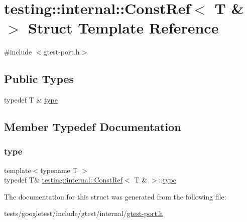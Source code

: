 \hypertarget{structtesting_1_1internal_1_1ConstRef_3_01T_01_6_01_4}{}\section{testing\+:\+:internal\+:\+:Const\+Ref$<$ T \& $>$ Struct Template Reference}
\label{structtesting_1_1internal_1_1ConstRef_3_01T_01_6_01_4}


{\ttfamily \#include $<$gtest-\/port.\+h$>$}

\subsection*{Public Types}
\begin{DoxyCompactItemize}
\item 
typedef T \& \hyperlink{structtesting_1_1internal_1_1ConstRef_3_01T_01_6_01_4_a9f664dd25649a0d260cfb1f610c7a349}{type}
\end{DoxyCompactItemize}


\subsection{Member Typedef Documentation}
\mbox{\label{structtesting_1_1internal_1_1ConstRef_3_01T_01_6_01_4_a9f664dd25649a0d260cfb1f610c7a349}} 
\subsubsection{\texorpdfstring{type}{type}}
{\footnotesize\ttfamily template$<$typename T $>$ \\
typedef T\& \hyperlink{structtesting_1_1internal_1_1ConstRef}{testing\+::internal\+::\+Const\+Ref}$<$ T \& $>$\+::\hyperlink{structtesting_1_1internal_1_1ConstRef_3_01T_01_6_01_4_a9f664dd25649a0d260cfb1f610c7a349}{type}}



The documentation for this struct was generated from the following file\+:\begin{DoxyCompactItemize}
\item 
tests/googletest/include/gtest/internal/\hyperlink{gtest-port_8h}{gtest-\/port.\+h}\end{DoxyCompactItemize}
